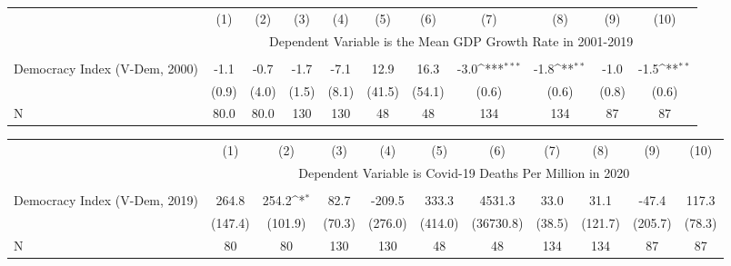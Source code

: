 {
\def\sym#1{\ifmmode^{#1}\else\(^{#1}\)\fi}
\begin{tabular}{l*{10}{c}}
\hline\hline
                    &\multicolumn{1}{c}{(1)}         &\multicolumn{1}{c}{(2)}         &\multicolumn{1}{c}{(3)}         &\multicolumn{1}{c}{(4)}         &\multicolumn{1}{c}{(5)}         &\multicolumn{1}{c}{(6)}         &\multicolumn{1}{c}{(7)}         &\multicolumn{1}{c}{(8)}         &\multicolumn{1}{c}{(9)}         &\multicolumn{1}{c}{(10)}         \\
&\multicolumn{10}{c}{ Dependent Variable is the Mean GDP Growth Rate in 2001-2019}\\\cline{2-11}\\[-1.8ex]
Democracy Index (V-Dem, 2000)&        -1.1         &        -0.7         &        -1.7         &        -7.1         &        12.9         &        16.3         &        -3.0\sym{***}&        -1.8\sym{**} &        -1.0         &        -1.5\sym{**} \\
                    &       (0.9)         &       (4.0)         &       (1.5)         &       (8.1)         &      (41.5)         &      (54.1)         &       (0.6)         &       (0.6)         &       (0.8)         &       (0.6)         \\
\hline
N                   &        80.0         &        80.0         &         130         &         130         &          48         &          48         &         134         &         134         &          87         &          87         \\
\hline\hline
\end{tabular}
}
{
\def\sym#1{\ifmmode^{#1}\else\(^{#1}\)\fi}
\begin{tabular}{l*{10}{c}}
\hline\hline
                    &\multicolumn{1}{c}{(1)}         &\multicolumn{1}{c}{(2)}         &\multicolumn{1}{c}{(3)}         &\multicolumn{1}{c}{(4)}         &\multicolumn{1}{c}{(5)}         &\multicolumn{1}{c}{(6)}         &\multicolumn{1}{c}{(7)}         &\multicolumn{1}{c}{(8)}         &\multicolumn{1}{c}{(9)}         &\multicolumn{1}{c}{(10)}         \\
&\multicolumn{10}{c}{ Dependent Variable is Covid-19 Deaths Per Million in 2020}\\\cline{2-11}\\[-1.8ex]
Democracy Index (V-Dem, 2019)&       264.8         &       254.2\sym{*}  &        82.7         &      -209.5         &       333.3         &      4531.3         &        33.0         &        31.1         &       -47.4         &       117.3         \\
                    &     (147.4)         &     (101.9)         &      (70.3)         &     (276.0)         &     (414.0)         &   (36730.8)         &      (38.5)         &     (121.7)         &     (205.7)         &      (78.3)         \\
\hline
N                   &          80         &          80         &         130         &         130         &          48         &          48         &         134         &         134         &          87         &          87         \\
\hline\hline
\end{tabular}
}
